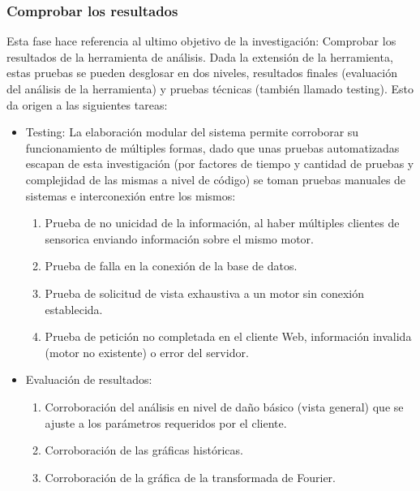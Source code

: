 \subsubsection{Comprobar los resultados}
Esta fase hace referencia al ultimo objetivo de la investigación: Comprobar los
resultados de la herramienta de análisis. Dada la extensión de la herramienta,
estas pruebas se pueden desglosar en dos niveles, resultados finales (evaluación
del análisis de la herramienta) y pruebas técnicas (también llamado testing).
Esto da origen a las siguientes tareas:

\begin{itemize}
    \item Testing: La elaboración modular del sistema permite  corroborar su
        funcionamiento de múltiples formas, dado que unas pruebas automatizadas
        escapan de esta investigación (por factores de tiempo y cantidad de pruebas
        y complejidad de las mismas a nivel de código) se toman pruebas manuales
        de sistemas e interconexión entre los mismos:
        \begin{enumerate}
            \item Prueba de no unicidad de la información, al haber múltiples
                clientes de sensorica enviando información sobre el mismo motor.
            \item Prueba de falla en la conexión de la base de datos.
            \item Prueba de solicitud de vista exhaustiva a un motor sin conexión
                establecida.
            \item Prueba de petición no completada en el cliente Web,
            información invalida (motor no existente) o error del servidor.
        \end{enumerate}

    \item Evaluación de resultados:
        \begin{enumerate}
            \item Corroboración del análisis en nivel de daño básico (vista general)
                que se ajuste a los parámetros requeridos por el cliente.
            \item Corroboración de las gráficas históricas.
            \item Corroboración de la gráfica de la transformada de Fourier.
        \end{enumerate}
\end{itemize}


